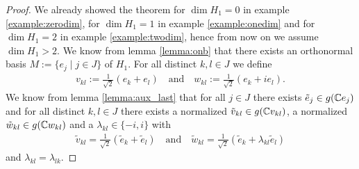 \begin{proof}
	We already showed the theorem for $\dim H_1 = 0$ in example \ref{example:zerodim}, for $\dim H_1 = 1$ in example \ref{example:onedim} and for $\dim H_1 = 2$ in example \ref{example:twodim}, hence from now on we assume $\dim H_1 > 2$. We know from lemma \ref{lemma:onb} that there exists an orthonormal basis $M := \{e_j \mid j \in J\}$ of $H_1$. For all distinct $k,l \in J$ we define
	\begin{align*}
		v_{kl} := \frac{1}{\sqrt{2}}(e_k + e_l) \quad \text{and} \quad w_{kl} := \frac{1}{\sqrt{2}}(e_k + ie_l).
	\end{align*}
	 We know from lemma \ref{lemma:aux_last} that for all $j \in J$ there exists $\tilde{e}_j \in g(\mathbb{C} e_j)$ and for all distinct $k,l \in J$ there exists a normalized $\tilde{v}_{kl} \in g(\mathbb{C} v_{kl})$, a normalized $\tilde{w}_{kl} \in g(\mathbb{C} w_{kl})$ and a $\lambda_{kl} \in \{-i, i\}$ with 
	 \begin{align*}
	 \tilde{v}_{kl} = \frac{1}{\sqrt{2}}(\tilde{e}_k + \tilde{e}_l) \quad \text{and} \quad \tilde{w}_{kl} = \frac{1}{\sqrt{2}}(\tilde{e}_k + \lambda_{kl} \tilde{e}_l)
	 \end{align*}
	 and $\lambda_{kl} = \lambda_{lk}$. 
	 

\end{proof}
